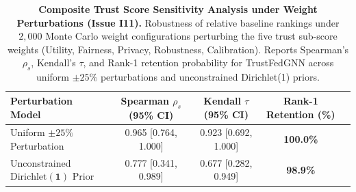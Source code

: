 \begin{table}[t]
\centering
\small
\caption{\textbf{Composite Trust Score Sensitivity Analysis under Weight Perturbations (Issue I11).}
Robustness of relative baseline rankings under $2{,}000$ Monte Carlo weight configurations perturbing the five trust sub-score weights (Utility, Fairness, Privacy, Robustness, Calibration).
Reports Spearman's $\rho_s$, Kendall's $\tau$, and Rank-1 retention probability for TrustFedGNN across uniform $\pm 25\%$ perturbations and unconstrained Dirichlet(1) priors.}
\label{tab:trust_score_sensitivity}
\begin{tabular}{lcccc}
\toprule
\textbf{Perturbation Model} & \textbf{Spearman $\rho_s$ (95\% CI)} & \textbf{Kendall $\tau$ (95\% CI)} & \textbf{Rank-1 Retention (\%)} \\
\midrule
Uniform $\pm 25\%$ Perturbation & 0.965 [0.764, 1.000] & 0.923 [0.692, 1.000] & \textbf{100.0\%} \\
Unconstrained $\text{Dirichlet}(\mathbf{1})$ Prior & 0.777 [0.341, 0.989] & 0.677 [0.282, 0.949] & \textbf{98.9\%} \\
\bottomrule
\end{tabular}
\end{table}
